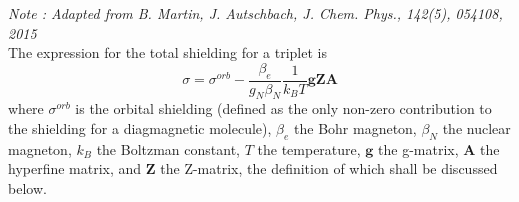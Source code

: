 \documentclass[12pt]{article}
\begin{document}
\noindent \emph{Note : Adapted from B. Martin, J. Autschbach, J. Chem. Phys., 142(5), 054108, 2015 } \\

\noindent The expression for the total shielding for a triplet is
\begin{equation}
\sigma = \sigma^{orb} - \frac{\beta_{e}}{g_{N}\beta_{N}}\frac{1}{k_{B}T} \mathbf{g}\mathbf{Z}\mathbf{A}
\label{eqn:totalshieldingtriplet}
\end{equation}
where $\sigma^{orb}$ is the orbital shielding (defined as the only non-zero contribution to the shielding for a diagmagnetic molecule), $\beta_{e}$ the Bohr magneton, $\beta_{N}$ the nuclear magneton,
$k_{B}$ the Boltzman constant, $T$ the temperature, $\mathbf{g}$ the g-matrix, $\mathbf{A}$ the hyperfine matrix, and $\mathbf{Z}$ the Z-matrix, the
definition of which shall be discussed below.\\
\end{document}
